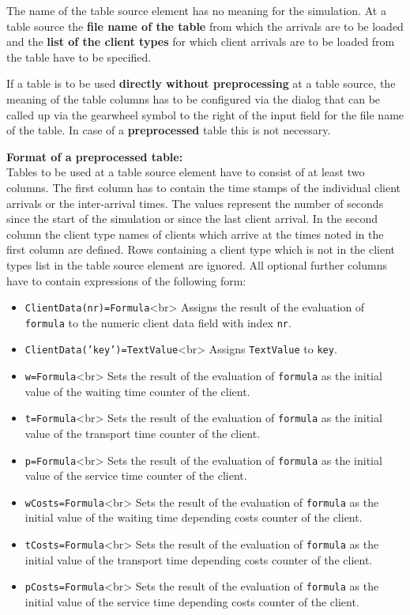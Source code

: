 The name of the table source element has no meaning for the simulation.
At a table source the \textbf{file name of the table} from which the arrivals
are to be loaded and the \textbf{list of the client types} for which client
arrivals are to be loaded from the table have to be specified.

If a table is to be used \textbf{directly without preprocessing} at a table source, 
the meaning of the table columns has to be configured via the dialog that can be
called up via the gearwheel symbol to the right of the input field
for the file name of the table. In case of a \textbf{preprocessed} table this is not necessary.

\textbf{Format of a preprocessed table:}~\\
Tables to be used at a table source element have to consist of at least two columns.
The first column has to contain the time stamps of the individual client arrivals
or the inter-arrival times. The values represent the number of seconds since the
start of the simulation or since the last client arrival.
In the second column the client type names of clients which arrive at the times
noted in the first column are defined. Rows containing a client type which is
not in the client types list in the table source element are ignored.
All optional further columns have to contain expressions of the following form:

\begin{itemize}
  \item \texttt{ClientData(nr)=Formula}<br>
  Assigns the result of the evaluation of \texttt{formula} to the numeric
  client data field with index \texttt{nr}. 
  \item \texttt{ClientData('key')=TextValue}<br>
  Assigns \texttt{TextValue} to \texttt{key}. 
  \item \texttt{w=Formula}<br>
  Sets the result of the evaluation of \texttt{formula} as the
  initial value of the waiting time counter of the client.   
  \item \texttt{t=Formula}<br>
  Sets the result of the evaluation of \texttt{formula} as the
  initial value of the transport time counter of the client.   
  \item \texttt{p=Formula}<br>
  Sets the result of the evaluation of \texttt{formula} as the
  initial value of the service time counter of the client. 
  \item \texttt{wCosts=Formula}<br>
  Sets the result of the evaluation of \texttt{formula} as the
  initial value of the waiting time depending costs counter of the client. 
  \item \texttt{tCosts=Formula}<br>
  Sets the result of the evaluation of \texttt{formula} as the
  initial value of the transport time depending costs counter of the client. 
  \item \texttt{pCosts=Formula}<br>
  Sets the result of the evaluation of \texttt{formula} as the
  initial value of the service time depending costs counter of the client. 
\end{itemize}

